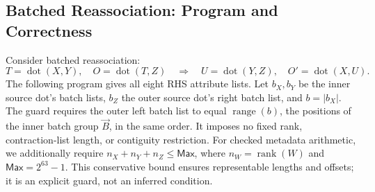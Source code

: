 \subsection{Batched Reassociation: Program and Correctness}
\label{app:batched-reassociation-program}
\label{extended:sec:partitioning}
Consider batched reassociation:
\begin{equation}
 T=\operatorname{dot}(X,Y),\quad O=\operatorname{dot}(T,Z)
 \quad\Rightarrow\quad
 U=\operatorname{dot}(Y,Z),\quad O'=\operatorname{dot}(X,U).
\end{equation}
The following program gives all eight RHS attribute lists. Let $b_X,b_Y$ be the inner source dot's batch lists,
$b_Z$ the outer source dot's right batch list, and $b=|b_X|$. The guard
requires the outer left batch list to equal $\operatorname{range}(b)$,
the positions of the inner batch group $\vec B$, in the same order. It imposes
no fixed rank, contraction-list length, or contiguity restriction.
For checked metadata arithmetic, we additionally require
$n_X+n_Y+n_Z\le\mathsf{Max}$, where $n_W=\operatorname{rank}(W)$ and
$\mathsf{Max}=2^{63}-1$. This conservative bound ensures representable
lengths and offsets; it is an explicit guard, not an inferred condition.

